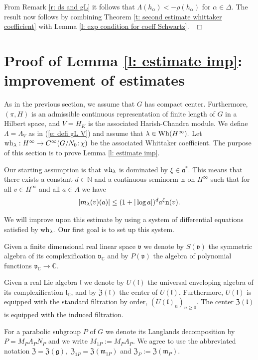 \documentclass[12pt,a4paper]{article}
\def\proof{\par\noindent{\it Proof.}{\ }{\ }}
\def\qed{~\hfill\hbox{$\Box$}\medbreak}
\def\msy#1{{\mathbb #1}}
\def\C{{\msy C}}
\def\N{{\msy N}}
\def\ga{\alpha}
\def\gl{\lambda}
\def\gD{\Delta}
\def\got#1{\mathfrak #1}
\def\fa{{\got a}}
\def\fg{{\got g}}
\def\fl{{\got l}}
\def\fm{{\got m}}
\def\to{\rightarrow}
\def\iC{{\scriptscriptstyle \C}}
\numberwithin{Thm}{section}
\numberwithin{equation}{section}
\def\fZ{{\mathfrak Z}}
\def\Wh{{\rm Wh}}
\def\gL{\Lambda}
\numberwithin{equation}{section}
\def\fad{{\fa^*}}
\def\fZ{{\mathfrak Z}}
\def\gL{\Lambda}
\def\fv{{\mathfrak v}}
\def\wh{{\rm wh}}
\def\col{\!:\!}
\def\cchi{\chi}
\begin{document}
\proof 
From Remark \ref{r: ds and gL} it follows that $\gL(h_\ga) < -\rho(h_\ga)$ 
for $\ga \in \gD.$ The result now follows by combining Theorem 
\ref{t: second estimate whittaker coefficient}
with Lemma \ref{l: exp condition for coeff Schwartz}.
\qed

\section{Proof of Lemma \ref{l: estimate imp}: improvement of estimates}
\label{s: proof of est imp}
As in the previous section, we assume that $G$ has compact center.
Furthermore, $(\pi, H)$ is an admissible continuous representation of finite length of $G$ in 
a Hilbert space, and $V = H_K$ is the associated Harish-Chandra module.
We define $\gL = \gL_V$ as in (\ref{e: defi gL V}) and assume that 
$\gl \in \Wh(H^\infty).$ Let  $\wh_\gl: H^\infty \to C^\infty(G/N_0\col\cchi)$ be 
the associated Whittaker coefficient. The purpose of this section is to
prove Lemma  \ref{l: estimate imp}.

Our starting assumption is that $\wh_\gl$ is dominated by $\xi \in \fad.$ This means
that there exists a constant $d \in \N$ and a continuous seminorm ${\rm n}$ 
on $H^\infty$ such that for all $v \in H^\infty$ and all $a\in A$ we have
\begin{equation}
\label{e: initial domination}
|m_\gl(v)(a)| \leq ( 1 + |\log a|)^d a^\xi {\rm n}(v).
\end{equation}

We will improve upon this estimate by using a system of differential equations
satisfied by $\wh_\gl.$ Our first goal is to set up this system.

Given a finite dimensional real linear space $\fv$ we denote by $S(\fv)$ the symmetric algebra
of its complexification $\fv_{\iC}$ and by $P(\fv)$ the algebra of polynomial
functions $\fv_\iC \to \C.$

Given a real Lie algebra $\fl$ we denote by $U(\fl)$ the universal enveloping algebra of
its complexification $\fl_\iC$, and by $\fZ(\fl)$ the center of $U(\fl).$ Furthermore, 
$U(\fl)$ is equipped with the standard filtration by order, $(U(\fl)_n)_{n \geq 0}.$ 
The center $\fZ(\fl)$ is equipped with the induced filtration. 

For a parabolic subgroup $P$ of $G$ we denote its Langlands decomposition
by $P = M_P A_P N_P$ and we  write $M_{1P}:= M_P A_P.$  
We agree to use the abbreviated notation $\fZ = \fZ(\fg),$ $\fZ_{1P}= \fZ(\fm_{1P})$ 
and $\fZ_P:= \fZ( \fm_P) .$
\end{document}
